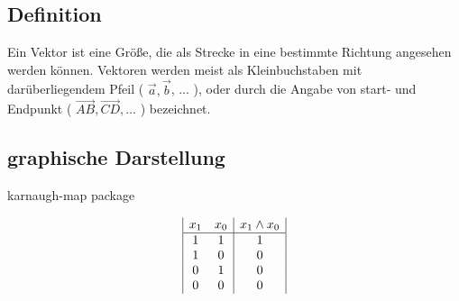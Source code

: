 \subsection{Definition}
Ein Vektor ist eine Größe, die als Strecke in eine bestimmte Richtung angesehen werden können.
Vektoren werden meist als Kleinbuchstaben mit darüberliegendem Pfeil ( $\vec{a}, \vec{b}$, ... ), oder
durch die Angabe von start- und Endpunkt ( $\overrightarrow{AB}, \overrightarrow{CD}, ...$ ) bezeichnet.


\subsection{graphische Darstellung}
karnaugh-map package

\begin{displaymath}
    \begin{array}{|c c|c|}
    x_1 & x_0 & x_1 \land x_0\\ %
    \hline %
    1 & 1 & 1\\
    1 & 0 & 0\\
    0 & 1 & 0\\
    0 & 0 & 0\\
    \end{array}
    \end{displaymath}